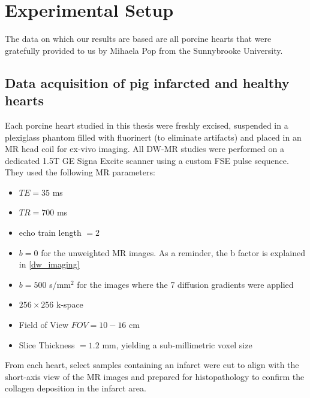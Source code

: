 
\chapter{Experimental Setup}

The data on which our results are based are all porcine hearts that were gratefully provided to us by Mihaela Pop from the Sunnybrooke University.

\section{Data acquisition of pig infarcted and healthy hearts}

Each porcine heart studied in this thesis were freshly excised, suspended in a plexiglass phantom filled with fluorinert (to eliminate artifacts) and placed in an MR head coil for ex-vivo imaging. All DW-MR studies were performed on a dedicated 1.5T GE Signa Excite scanner using a custom FSE pulse sequence. They used the following MR parameters: 
\begin{itemize}
    \item $TE = 35$ ms
    \item $TR = 700$ ms
    \item echo train length $=2$
    \item $b = 0$ for the unweighted MR images. As a reminder, the b factor is explained in \ref{dw_imaging}
    \item $b = 500 $ s/$\text{mm}^2$ for the images where the 7 diffusion gradients were applied
    \item $256 \times 256$ k-space
    \item Field of View $FOV = 10-16$ cm
    \item Slice Thickness $ = 1.2$ mm, yielding a sub-millimetric voxel size
\end{itemize}
From each heart, select samples containing an infarct were cut to align with the short-axis view of the MR images and prepared for histopathology to confirm the collagen deposition in the infarct area.


